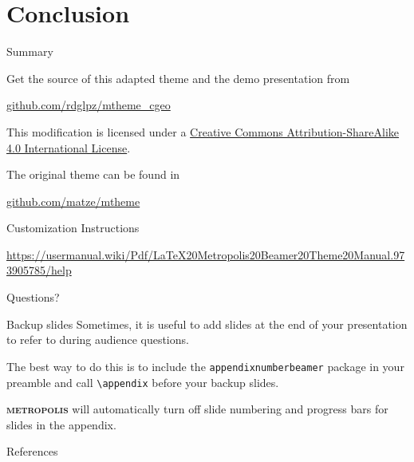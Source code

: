 \documentclass[10pt]{beamer}
\newcommand{\themename}{\textbf{\textsc{metropolis}}\xspace}
\begin{document}
\section{Conclusion}

\begin{frame}{Summary}

  Get the source of this adapted theme and the demo presentation from
	\begin{center}\url{github.com/rdglpz/mtheme_cgeo}\end{center}
  

  This modification is licensed under a
  \href{http://creativecommons.org/licenses/by-sa/4.0/}{Creative Commons
  Attribution-ShareAlike 4.0 International License}.

The original theme can be found in 
\begin{center}\url{github.com/matze/mtheme}\end{center}

Customization Instructions 

\url{https://usermanual.wiki/Pdf/LaTeX20Metropolis20Beamer20Theme20Manual.973905785/help}

  \begin{center}\ccbysa\end{center}

\end{frame}

{
\begin{frame}[standout]
  Questions?
\end{frame}
}

\appendix

\begin{frame}[fragile]{Backup slides}
  Sometimes, it is useful to add slides at the end of your presentation to
  refer to during audience questions.

  The best way to do this is to include the \verb|appendixnumberbeamer|
  package in your preamble and call \verb|\appendix| before your backup slides.

  \themename will automatically turn off slide numbering and progress bars for
  slides in the appendix.
\end{frame}

\begin{frame}[allowframebreaks]{References}

  
  

\end{frame}
\end{document}
